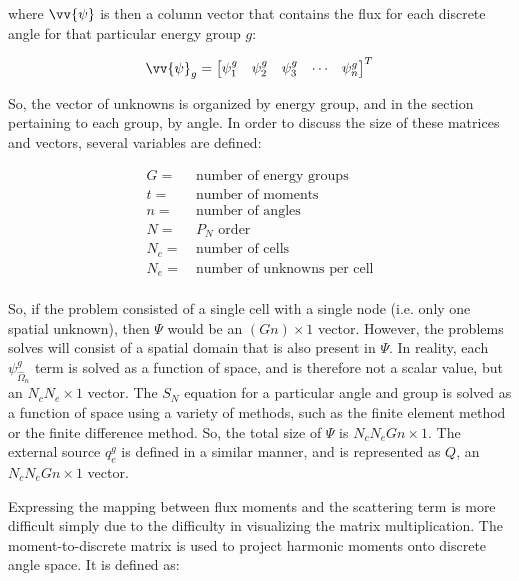 \documentclass[10pt]{article}
\begin{document}
where \(\vv{\psi}\) is then a column vector that contains the flux for each discrete angle for that particular energy group \(g\):

\begin{equation}
\vv{\psi}_g=\begin{bmatrix}\psi_1^g&\psi_2^g&\psi_3^g&\cdots&\psi_n^g\end{bmatrix}^T
\end{equation}

So, the vector of unknowns is organized by energy group, and in the section pertaining to each group, by angle. In order to discuss the size of these matrices and vectors, several variables are defined:

\begin{equation}
\begin{aligned}
G=&\ \text{number of energy groups}\\
t = &\ \text{number of moments}\\
n = &\ \text{number of angles}\\
N = &\ P_N\text{\ order}\\
N_c=&\ \text{number of cells}\\
N_e=&\ \text{number of unknowns per cell}\\
\end{aligned}
\end{equation} 

So, if the problem consisted of a single cell with a single node (i.e. only one spatial unknown), then \(\Psi\) would be an \((Gn)\times1\) vector. However, the problems solves will consist of a spatial domain that is also present in \(\Psi\). In reality, each \(\psi_{\hat{\Omega}_n}^g\) term is solved as a function of space, and is therefore not a scalar value, but an \(N_cN_e\times1\) vector. The \(S_N\) equation for a particular angle and group is solved as a function of space using a variety of methods, such as the finite element method or the finite difference method. So, the total size of \(\Psi\) is \(N_cN_eGn\times1\). The external source \(q_e^g\) is defined in a similar manner, and is represented as \(Q\), an \(N_cN_eGn\times1\) vector.

Expressing the mapping between flux moments and the scattering term is more difficult simply due to the difficulty in visualizing the matrix multiplication. The moment-to-discrete matrix is used to project harmonic moments onto discrete angle space. It is defined as:
\end{document}
